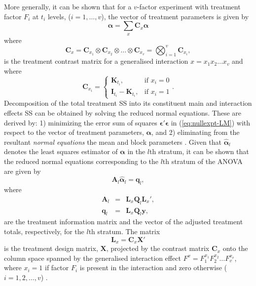 \documentclass[article]{jss}
\newcommand{\I}{\mathbf{I}}
\newcommand{\K}{\mathbf{K}}
\newcommand{\X}{\mathbf{X}}
\newcommand{\Q}{\mathbf{Q}}
\newcommand{\A}{\mathbf{A}}
\newcommand{\C}{\mathbf{C}}
\newcommand{\mL}{\mathbf{L}}
\begin{document}
More generally, it can be shown that for a $v$-factor experiment with treatment factor $F_i$ at $t_i$ levels, ($i = 1, \dots, v$), the vector of treatment parameters is given by 
\begin{equation}
\bm{\alpha} = \sum_x{\C_x\bm{\alpha}}
\end{equation}
where 
\[
\C_x =  \C_{x_1} \otimes  \C_{x_2} \otimes \dots \otimes  \C_{x_{v}} = \bigotimes^{v} _{i = 1} \C_{x_i},
\]
is the treatment contrast matrix for a generalised interaction $x = x_1 x_2 \dots x_{v}$ and where   
\begin{equation}
\label{eq:contrMat}
 \C_{x_i} =  
   \begin{cases}
       \K_{t_i}, & \mbox{if } x_i = 0 \\
       \I_{t_i} - \K_{t_i}, & \mbox{if } x_i = 1
    \end{cases}.
\end{equation}
Decomposition of the total treatment SS into its constituent main and interaction effects SS can be obtained by solving the reduced normal equations. These are derived by: 1) minimizing the error sum of squares $\bm{\epsilon}'\bm{\epsilon}$ in (\ref{eq:nullexpt-LM}) with respect to the vector of treatment parameters, $\bm{\alpha}$, and 2) eliminating from the resultant \emph{normal equations} the mean and block parameters \citep{John1987}. Given that $\hat{\bm{\alpha}}_l$ denotes the least squares estimator of $\bm{\alpha}$ in the $l$th stratum, it can be shown that the reduced normal equations corresponding to the $l$th stratum of the ANOVA are given by
\begin{equation}\label{eq:reduceNorml}
\A_l\hat{\bm{\alpha}}_l = \bm{q}_l,
\end{equation}
where
\begin{eqnarray}
\label{eq:infomat-stratuml} \A_l &=& \mL_{x} \Q_l \mL_{x}',\\
\label{eq:adjtrttotals-stratuml} \bm{q}_l &=& \mL_{x} \Q_l\bm{y},
\end{eqnarray}  
are the treatment information matrix and the vector of the adjusted treatment totals, respectively, for the $l$th stratum. The matrix 
\[
\mL_{x} = \C_x \X'
\]
is the treatment design matrix, $\X$, projected by the contrast matrix $\C_{x}$ onto the column space spanned by the generalised interaction effect $F^{x}=  F^{x_1}_1 F^{x_2}_2 \dots F^{x_v}_v$, where $x_i=1$ if factor $F_i$ is present in the interaction and zero otherwise ($i=1,2,\ldots,v$) \citep{John1987}.
\end{document}
